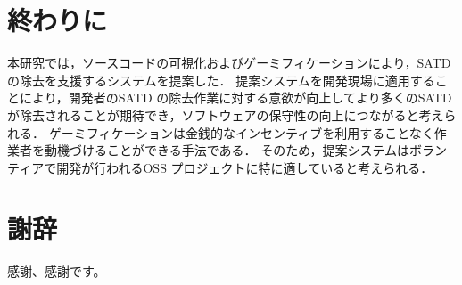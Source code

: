 \chapter{終わりに}
本研究では，ソースコードの可視化およびゲーミフィケーションにより，SATD の除去を支援するシステムを提案した．
提案システムを開発現場に適用することにより，開発者のSATD の除去作業に対する意欲が向上してより多くのSATD が除去されることが期待でき，ソフトウェアの保守性の向上につながると考えられる．
ゲーミフィケーションは金銭的なインセンティブを利用することなく作業者を動機づけることができる手法である．
そのため，提案システムはボランティアで開発が行われるOSS プロジェクトに特に適していると考えられる．

\newpage

\chapter*{謝辞}
感謝、感謝です。